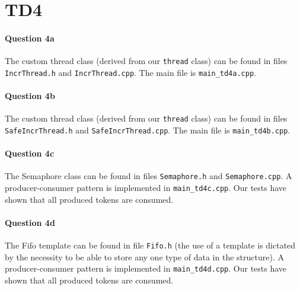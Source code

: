 \documentclass[a4paper,oneside,11pt]{article}
\begin{document}
\section*{TD4}
\paragraph{Question 4a} The custom thread class (derived from our \texttt{thread} class) can be found in files \texttt{IncrThread.h} and \texttt{IncrThread.cpp}. The main file is \texttt{main\_td4a.cpp}.

\paragraph{Question 4b} The custom thread class (derived from our \texttt{thread} class) can be found in files \texttt{SafeIncrThread.h} and \texttt{SafeIncrThread.cpp}. The main file is \texttt{main\_td4b.cpp}.

\paragraph{Question 4c} The Semaphore class can be found in files \texttt{Semaphore.h} and \texttt{Semaphore.cpp}. A producer-consumer pattern is implemented in \texttt{main\_td4c.cpp}. Our tests have shown that all produced tokens are consumed.

\paragraph{Question 4d} The Fifo template can be found in file \texttt{Fifo.h} (the use of a template is dictated by the necessity to be able to store any one type of data in the structure). A producer-consumer pattern is implemented in \texttt{main\_td4d.cpp}. Our tests have shown that all produced tokens are consumed.
\end{document}
